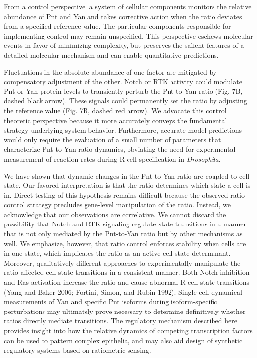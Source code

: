 From a control perspective, a system of cellular components monitors the relative abundance of Pnt and Yan and takes corrective action when the ratio deviates from a specified reference value. The particular components responsible for implementing control may remain unspecified. This perspective eschews molecular events in favor of minimizing complexity, but preserves the salient features of a detailed molecular mechanism and can enable quantitative predictions.

Fluctuations in the absolute abundance of one factor are mitigated by compensatory adjustment of the other. Notch or RTK activity could modulate Pnt or Yan protein levels to transiently perturb the Pnt-to-Yan ratio (Fig. 7B, dashed black arrow). These signals could permanently set the ratio by adjusting the reference value (Fig. 7B, dashed red arrow). We advocate this control theoretic perspective because it more accurately conveys the fundamental strategy underlying system behavior. Furthermore, accurate model predictions would only require the evaluation of a small number of parameters that characterize Pnt-to-Yan ratio dynamics, obviating the need for experimental measurement of reaction rates during R cell specification in \textit{Drosophila}.

We have shown that dynamic changes in the Pnt-to-Yan ratio are coupled to cell state. Our favored interpretation is that the ratio determines which state a cell is in. Direct testing of this hypothesis remains difficult because the observed ratio control strategy precludes gene-level manipulation of the ratio. Instead, we acknowledge that our observations are correlative. We cannot discard the possibility that Notch and RTK signaling regulate state transitions in a manner that is not only mediated by the Pnt-to-Yan ratio but by other mechanisms as well. We emphasize, however, that ratio control enforces stability when cells are in one state, which implicates the ratio as an active cell state determinant. Moreover, qualitatively different approaches to experimentally manipulate the ratio affected cell state transitions in a consistent manner. Both Notch inhibition and Ras activation increase the ratio and cause abnormal R cell state transitions (Yang and Baker 2006; Fortini, Simon, and Rubin 1992). Single-cell dynamical measurements of Yan and specific Pnt isoforms during isoform-specific perturbations may ultimately prove necessary to determine definitively whether ratios directly mediate transitions. The regulatory mechanism described here provides insight into how the relative dynamics of competing transcription factors can be used to pattern complex epithelia, and may also aid design of synthetic regulatory systems based on ratiometric sensing.




